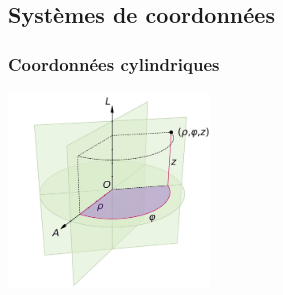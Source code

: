 
\begin{multicols}{2}

    \subsection{Systèmes de coordonnées}
    
    \subsubsection*{Coordonnées cylindriques}


    \begin{center}
        \includegraphics[width=0.4\textwidth]{figures/cylindriques.png}
    \end{center}


\end{multicols}
